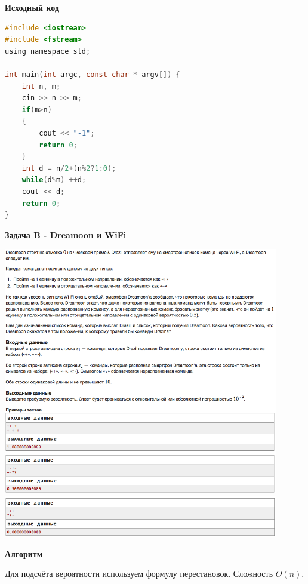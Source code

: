 \documentclass[a4paper,12pt]{article}
\begin{document}
\textbf{{\large Исходный код}} \\
\begin{lstlisting}[language=C]
#include <iostream>
#include <fstream>
using namespace std;

int main(int argc, const char * argv[]) {
    int n, m;
    cin >> n >> m;
    if(m>n)
    {
        cout << "-1";
        return 0;
    }
    int d = n/2+(n%2?1:0);
    while(d%m) ++d;
    cout << d;
    return 0;
}
\end{lstlisting}

\newpage
\textbf{{\large Задача B - Dreamoon и WiFi}} \\
\begin{center}
\includegraphics[width=0.9\textwidth]{C_272/C_272_B1.png}\\ [1cm]
\includegraphics[width=0.9\textwidth]{C_272/C_272_B2.png}\\ [1cm]
\end{center}

\textbf{{\large Алгоритм}}

Для подсчёта вероятности используем формулу перестановок. Сложность $O(n)$.\\
\end{document}
